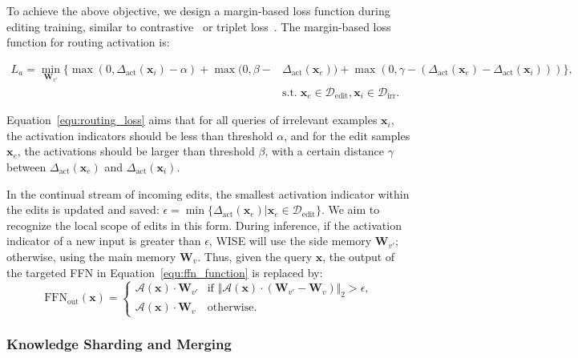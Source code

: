 To achieve the above objective, we design a margin-based loss function during editing training, similar to contrastive~\cite{simclr} or triplet loss~\cite{triple_loss}. The margin-based loss function for routing activation is:
\begin{small}
\begin{align}
    L_a = \min_{\mathbf{W}_{v'}} \{ \max(0, \Delta_{\text{act}}(\mathbf{x}_i) - \alpha) + \max(0, \beta -& \Delta_{\text{act}}(\mathbf{x}_e)) + \max(0, \gamma - (\Delta_{\text{act}}(\mathbf{x}_e) - \Delta_{\text{act}}(\mathbf{x}_i))) \},\label{equ:routing_loss}\\
    &\text{s.t.}\; \mathbf{x}_e \in \mathcal{D}_{\text{edit}}, \mathbf{x}_i \in \mathcal{D}_{\text{irr}}.\nonumber
\end{align}
\end{small}
Equation~\ref{equ:routing_loss} aims that for all queries of irrelevant examples $\mathbf{x}_i$, the activation indicators should be less than threshold $\alpha$, and for the edit samples $\mathbf{x}_e$, the activations should be larger than threshold $\beta$, with a certain distance $\gamma$ between $\Delta_{\text{act}}(\mathbf{x}_e)$ and $\Delta_{\text{act}}(\mathbf{x}_i)$.

In the continual stream of incoming edits, the smallest activation indicator within the edits is updated and saved:
$\epsilon = \min \{\Delta_{\text{act}}(\mathbf{x}_e)| \mathbf{x}_e \in \mathcal{D}_{\text{edit}}\}$.
We aim to recognize the local scope of edits in this form.
During inference, if the activation indicator of a new input is greater than $\epsilon$, WISE will use the side memory $\mathbf{W}_{v'}$; otherwise, using the main memory $\mathbf{W}_{v}$. 
Thus, given the query $\mathbf{x}$, the output of the targeted FFN in Equation~\ref{equ:ffn_function} is replaced by:
\begin{equation}\label{equ:ffn_out}
    \text{FFN}_\text{out}(\mathbf{x}) = \begin{cases}
    \mathcal{A}(\mathbf{x}) \cdot \mathbf{W}_{v'} &\mbox{if $\Vert \mathcal{A}(\mathbf{x}) \cdot (\mathbf{W}_{v'} - \mathbf{W}_v) \Vert_2 > \epsilon$,}\\
    \mathcal{A}(\mathbf{x}) \cdot \mathbf{W}_{v} &\mbox{otherwise.}
    \end{cases}
\end{equation}

\subsubsection{Knowledge Sharding and Merging} \label{subsec:knowledge_merging}

